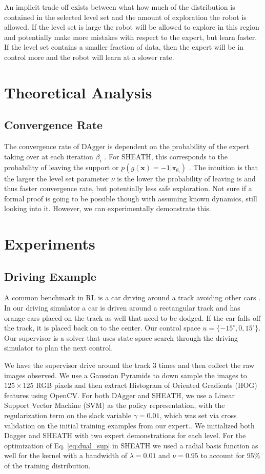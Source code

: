 \documentclass[10pt, conference]{ieeeconf}      %
\begin{document}
An implicit trade off exists between what how much of the distribution is contained in the selected level set and the amount of exploration the robot is allowed. If the level set is large the robot will be allowed to explore in this region and potentially make more mistakes with respect to the expert, but learn faster. If the level set contains a smaller fraction of data, then the expert will be in control more and the robot will learn at a slower rate. 


\section{Theoretical Analysis}

\subsection{Convergence Rate}
The convergence rate of DAgger is dependent on the probability of the expert taking over at each iteration $\beta_i$ \cite{ross2010reduction}. For SHEATH, this corresponds to the probability of leaving the support or $p(g(\mathbf{x}) = -1|\pi_{\theta_i})$ . The intuition is that the larger the level set parameter $\nu$ is the lower the probability of leaving is and thus faster convergence rate, but potentially less safe exploration. Not sure if a formal proof is going to be possible though with assuming known dynamics, still looking into it. However, we can experimentally demonstrate this. 




\section{Experiments}
\subsection{Driving Example}
A common benchmark in RL is a car driving around a track avoiding other cars \cite{argall2009survey}. In our driving simulator a car is driven around a rectangular track and has orange cars placed on the track as well that need to be dodged. If the car falls off the track, it is placed back on to the center. Our control space $u = \lbrace -15^\circ, 0, 15^\circ \rbrace$. Our supervisor is a solver that uses state space search through the driving simulator to plan the next control.

We have the supervisor drive around the track 3 times and then collect the raw images observed. We use a Gaussian Pyramids to down sample the images to $125 \times 125$ RGB pixels and then extract Histogram of Oriented Gradients (HOG) features using OpenCV. For both DAgger and SHEATH, we use a Linear Support Vector Machine (SVM) as the policy representation, with the regularization term on the slack variable $\gamma=0.01$, which was set via cross validation on the initial training examples from our expert.. We initialized both Dagger and SHEATH with two expert demonstrations for each level. For the optimization of Eq. \ref{eq:dual_sup} in SHEATH we used a radial basis function as well for the kernel with a bandwidth of $\lambda=0.01$ and $\nu = 0.95$ to account for $95\%$ of the training distribution. 
\end{document}
